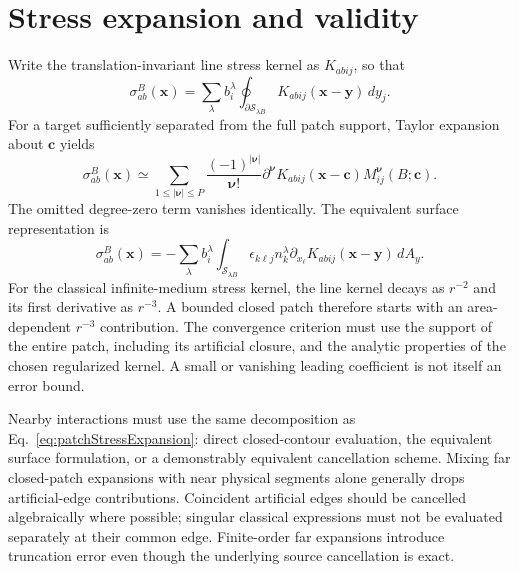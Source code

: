\section{Stress expansion and validity}
Write the translation-invariant line stress kernel as $K_{abij}$, so that
\begin{equation}
 \sigma_{ab}^{B}(\bm x)=\sum_\lambda b_i^\lambda
 \oint_{\partial\mathcal S_{\lambda B}}K_{abij}(\bm x-\bm y)\,dy_j.
\end{equation}
For a target sufficiently separated from the full patch support, Taylor expansion about $\bm c$ yields
\begin{equation}
 \sigma_{ab}^{B}(\bm x)\simeq
 \sum_{1\le|\boldsymbol\nu|\le P}
 \frac{(-1)^{|\boldsymbol\nu|}}{\boldsymbol\nu!}
 \partial^{\boldsymbol\nu}K_{abij}(\bm x-\bm c)
 M_{ij}^{\boldsymbol\nu}(B;\bm c).
 \label{eq:patchStressExpansion}
\end{equation}
The omitted degree-zero term vanishes identically. The equivalent surface representation is
\begin{equation}
 \sigma_{ab}^{B}(\bm x)
 =-\sum_\lambda b_i^\lambda\int_{\mathcal S_{\lambda B}}
 \epsilon_{k\ell j}n_k^\lambda
 \partial_{x_\ell}K_{abij}(\bm x-\bm y)\,dA_y.
 \label{eq:patchSurfaceStress}
\end{equation}
For the classical infinite-medium stress kernel, the line kernel decays as $r^{-2}$ and its first derivative as $r^{-3}$. A bounded closed patch therefore starts with an area-dependent $r^{-3}$ contribution. The convergence criterion must use the support of the entire patch, including its artificial closure, and the analytic properties of the chosen regularized kernel. A small or vanishing leading coefficient is not itself an error bound.

Nearby interactions must use the same decomposition as Eq.~\eqref{eq:patchStressExpansion}: direct closed-contour evaluation, the equivalent surface formulation, or a demonstrably equivalent cancellation scheme. Mixing far closed-patch expansions with near physical segments alone generally drops artificial-edge contributions. Coincident artificial edges should be cancelled algebraically where possible; singular classical expressions must not be evaluated separately at their common edge. Finite-order far expansions introduce truncation error even though the underlying source cancellation is exact.

